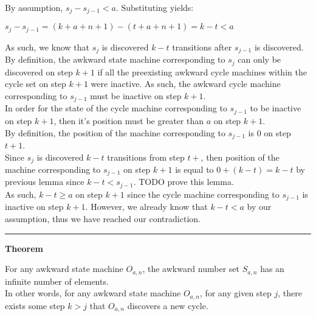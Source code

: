 \documentclass[a4paper,12pt]{article}
\begin{document}
\noindent By assumption, $s_j - s_{j-1} < a$. Substituting yields:
\begin{center}
$s_j - s_{j-1} = (k + a + n + 1) - (t + a + n + 1) = k - t < a$
\end{center}

\noindent As such, we know that $s_j$ is discovered $k - t$ transitions after $s_{j-1}$ is discovered.\\

\noindent By definition, the awkward state machine corresponding to $s_j$ can only be discovered on step $k + 1$ if all the preexisting awkward cycle machines within the cycle set on step $k + 1$ were inactive. As such, the awkward cycle machine corresponding to $s_{j-1}$ must be inactive on step $k + 1$.\\

\noindent In order for the state of the cycle machine corresponding to $s_{j-1}$ to be inactive on step $k + 1$, then it's position must be greater than $a$ on step $k + 1$.\\

\noindent By definition, the position of the machine corresponding to $s_{j-1}$ is $0$ on step $t + 1$.\\

\noindent Since $s_j$ is discovered $k - t$ transitions from step $t + $, then position of the machine corresponding to $s_{j-1}$ on step $k + 1$ is equal to $0 + (k - t) = k - t$ by previous lemma since $k - t < s_{j-1}$. TODO prove this lemma.\\

\noindent As such, $k - t \geq a$ on step $k + 1$ since the cycle machine corresponding to $s_{j-1}$ is inactive on step $k + 1$. However, we already know that $k - t < a$ by our assumption, thus we have reached our contradiction.


\begin{center}
\noindent\rule{8cm}{0.4pt}
\end{center}


\label{lemma:min_cycle_length}
\hypertarget{theorem:infinite_cycles}{}
\begin{tcolorbox}
\textbf{Theorem}

For any awkward state machine $O_{a,n}$, the awkward number set $S_{a,n}$ has an infinite number of elements.\\

In other words, for any awkward state machine $O_{a,n}$, for any given step $j$, there exists some step $k > j$ that $O_{a,n}$ discovers a new cycle.
\end{tcolorbox}
\end{document}
